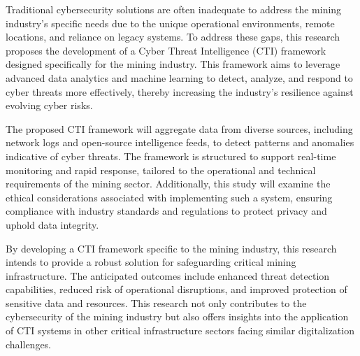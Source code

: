 \documentclass[a4paper,twoside,12pt]{report}
\begin{document}
Traditional cybersecurity solutions are often inadequate to address the mining industry’s specific needs due to the unique operational environments, remote locations, and reliance on legacy systems. To address these gaps, this research proposes the development of a Cyber Threat Intelligence (CTI) framework designed specifically for the mining industry. This framework aims to leverage advanced data analytics and machine learning to detect, analyze, and respond to cyber threats more effectively, thereby increasing the industry’s resilience against evolving cyber risks.

The proposed CTI framework will aggregate data from diverse sources, including network logs and open-source intelligence feeds, to detect patterns and anomalies indicative of cyber threats. The framework is structured to support real-time monitoring and rapid response, tailored to the operational and technical requirements of the mining sector. Additionally, this study will examine the ethical considerations associated with implementing such a system, ensuring compliance with industry standards and regulations to protect privacy and uphold data integrity.

By developing a CTI framework specific to the mining industry, this research intends to provide a robust solution for safeguarding critical mining infrastructure. The anticipated outcomes include enhanced threat detection capabilities, reduced risk of operational disruptions, and improved protection of sensitive data and resources. This research not only contributes to the cybersecurity of the mining industry but also offers insights into the application of CTI systems in other critical infrastructure sectors facing similar digitalization challenges.



\end{document}
